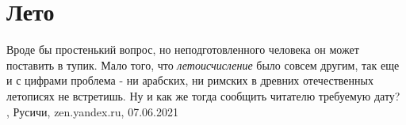 
 
 
 
 
\chapter{Лето}
\label{sec:slova.leto}

Вроде бы простенький вопрос, но неподготовленного человека он может поставить в
тупик. Мало того, что \emph{летоисчисление} было совсем другим, так еще и с цифрами
проблема - ни арабских, ни римских в древних отечественных летописях не
встретишь. Ну и как же тогда сообщить читателю требуемую дату?
, 
Русичи, zen.yandex.ru, 07.06.2021
